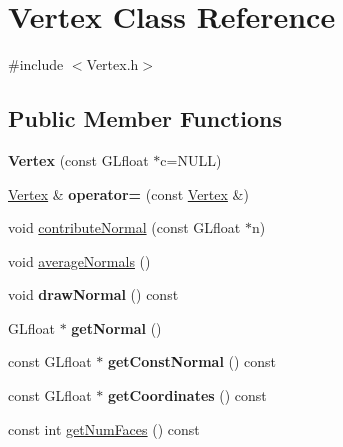 \hypertarget{classVertex}{\section{Vertex Class Reference}
\label{classVertex}
}


{\ttfamily \#include $<$Vertex.\-h$>$}

\subsection*{Public Member Functions}
\begin{DoxyCompactItemize}
\item 
\hypertarget{classVertex_aaeb85c70765a8a11cc54148054746129}{{\bfseries Vertex} (const G\-Lfloat $\ast$c=N\-U\-L\-L)}\label{classVertex_aaeb85c70765a8a11cc54148054746129}

\item 
\hypertarget{classVertex_a00ad86006f91af73121896906b2e0faa}{\hyperlink{classVertex}{Vertex} \& {\bfseries operator=} (const \hyperlink{classVertex}{Vertex} \&)}\label{classVertex_a00ad86006f91af73121896906b2e0faa}

\item 
void \hyperlink{classVertex_a437201cc8e7ae5b8f49f47fe9dd4beba}{contribute\-Normal} (const G\-Lfloat $\ast$n)
\item 
void \hyperlink{classVertex_a8ab3c20d57d0626ebbc15271376a7a8d}{average\-Normals} ()
\item 
\hypertarget{classVertex_a5b5b877aedb2ca726643302fe440ca19}{void {\bfseries draw\-Normal} () const }\label{classVertex_a5b5b877aedb2ca726643302fe440ca19}

\item 
\hypertarget{classVertex_a17aebadfb3748f956ddf098b171c09ca}{G\-Lfloat $\ast$ {\bfseries get\-Normal} ()}\label{classVertex_a17aebadfb3748f956ddf098b171c09ca}

\item 
\hypertarget{classVertex_af674e1c88da20e86a18a7e06370eac5d}{const G\-Lfloat $\ast$ {\bfseries get\-Const\-Normal} () const }\label{classVertex_af674e1c88da20e86a18a7e06370eac5d}

\item 
\hypertarget{classVertex_a5963c45ed490edba17cb4e0030e6781e}{const G\-Lfloat $\ast$ {\bfseries get\-Coordinates} () const }\label{classVertex_a5963c45ed490edba17cb4e0030e6781e}

\item 
const int \hyperlink{classVertex_ad378995fa3c86a6d37e7746c7cb6873e}{get\-Num\-Faces} () const 
\end{DoxyCompactItemize}


